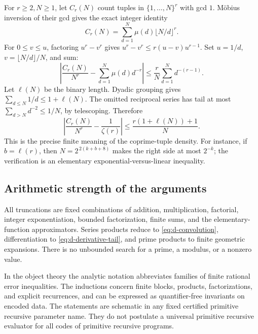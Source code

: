 For \(r\geq2,N\geq1\), let \(C_r(N)\) count tuples in
\(\{1,\ldots,N\}^r\) with gcd \(1\). M\"obius inversion of their gcd
gives the exact integer identity
\[
                  C_r(N)=\sum_{d=1}^{N}\mu(d)\lfloor N/d\rfloor^r.
                                                               \tag{D29}\label{eq:d-coprime-count}
\]
For \(0\leq v\leq u\), factoring \(u^r-v^r\) gives
\(u^r-v^r\leq r(u-v)u^{r-1}\).
Set \(u=1/d\), \(v=\lfloor N/d\rfloor/N\), and sum:
\[
 \left|\frac{C_r(N)}{N^r}-\sum_{d=1}^N\mu(d)d^{-r}\right|
       \leq\frac rN\sum_{d=1}^Nd^{-(r-1)}.
\]
Let \(\ell(N)\) be the binary length. Dyadic grouping gives
\(\sum_{d\leq N}1/d\leq1+\ell(N)\).
The omitted reciprocal series has tail at most
\(\sum_{d>N}d^{-2}\leq1/N\), by telescoping. Therefore
\[
 \boxed{\left|\frac{C_r(N)}{N^r}-\frac1{\zeta(r)}\right|
          \leq\frac{r(1+\ell(N))+1}{N}.}              \tag{D30}\label{eq:d-coprime-density}
\]
This is the precise finite meaning of the coprime-tuple density.
For instance, if \(b=\ell(r)\), then
\(N=2^{\,2(k+b+8)}\) makes the right side at most \(2^{-k}\);
the verification is an elementary exponential-versus-linear inequality.

\subsection{Arithmetic strength of the arguments}

All truncations are fixed combinations of addition, multiplication,
factorial, integer exponentiation, bounded factorization, finite sums,
and the elementary-function approximators. Series products reduce to
\eqref{eq:d-convolution}, differentiation to
\eqref{eq:d-derivative-tail}, and prime products to finite geometric
expansions. There is no unbounded search for a prime, a modulus, or a
nonzero value.

In the object theory the analytic notation abbreviates families of
finite rational error inequalities. The inductions concern finite
blocks, products, factorizations, and explicit recurrences, and can be
expressed as quantifier-free invariants on encoded data. The statements
are schematic in any fixed certified primitive recursive parameter name.
They do not postulate a universal primitive recursive evaluator for all
codes of primitive recursive programs.
